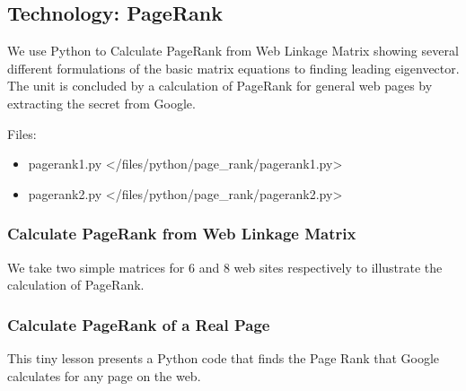 \subsection{Technology: PageRank}\label{technology-pagerank}

We use Python to Calculate PageRank from Web Linkage Matrix showing
several different formulations of the basic matrix equations to finding
leading eigenvector. The unit is concluded by a calculation of PageRank
for general web pages by extracting the secret from Google.

Files:

\begin{itemize}
\tightlist
\item
  pagerank1.py \textless{}/files/python/page\_rank/pagerank1.py\textgreater{}
\item
  pagerank2.py \textless{}/files/python/page\_rank/pagerank2.py\textgreater{}
\end{itemize}

\subsubsection{Calculate PageRank from Web Linkage
Matrix}\label{calculate-pagerank-from-web-linkage-matrix}

We take two simple matrices for 6 and 8 web sites respectively to
illustrate the calculation of PageRank.

\subsubsection{Calculate PageRank of a Real
Page}\label{calculate-pagerank-of-a-real-page}

This tiny lesson presents a Python code that finds the Page Rank that
Google calculates for any page on the web.
